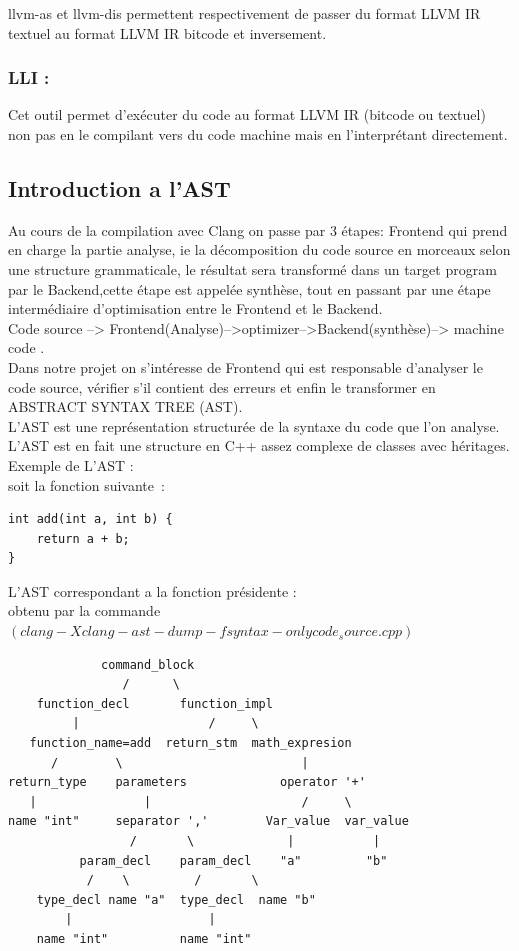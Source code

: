 \documentclass[12pt,titlepage]{article}
\begin{document}
    llvm-as et llvm-dis permettent respectivement de passer du format LLVM IR textuel au format LLVM IR bitcode et inversement.

    \subsubsection{ LLI : } 
    Cet outil permet d’exécuter du code au format LLVM IR (bitcode ou textuel) non pas en le compilant vers du code machine mais en l’interprétant directement.
    
\subsection{Introduction a l'AST}

Au cours de la compilation avec Clang on passe par 3 étapes: Frontend qui prend en charge la partie analyse, ie la décomposition du code source en morceaux selon une structure grammaticale, le résultat sera transformé  dans un target program par le Backend,cette étape est appelée synthèse, tout en passant par une étape intermédiaire d'optimisation entre le Frontend et le Backend.\\
Code source --> Frontend(Analyse)-->optimizer-->Backend(synthèse)--> machine code .\\
Dans notre projet on s’intéresse de Frontend qui est responsable d'analyser le code source, vérifier s'il contient des erreurs et enfin le transformer en ABSTRACT SYNTAX TREE (AST).\\
L'AST est une représentation structurée de la syntaxe du code que l'on analyse. \\
L'AST est en fait une structure en C++ assez complexe de classes avec héritages.\\
Exemple de L'AST :\\
soit la fonction  suivante :

\begin{lstlisting}
int add(int a, int b) {
    return a + b;
}
\end{lstlisting}

L'AST correspondant a la fonction présidente :\\
obtenu par la commande $(clang -Xclang -ast-dump -fsyntax-only code_source.cpp) $
\begin{lstlisting}
             command_block
                /      \
    function_decl       function_impl
         |                  /     \
   function_name=add  return_stm  math_expresion
      /        \                         |
return_type    parameters             operator '+'
   |               |                     /     \
name "int"     separator ','        Var_value  var_value
                 /       \             |           |
          param_decl    param_decl    "a"         "b"
           /    \         /       \
    type_decl name "a"  type_decl  name "b"
        |                   |
    name "int"          name "int"
\end{lstlisting}










\pagebreak 

\nocite{*} 


\end{document}
